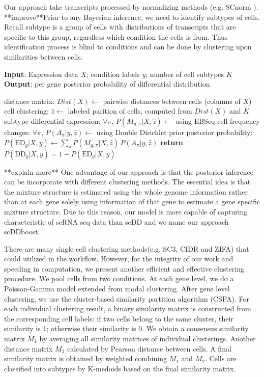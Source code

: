 \documentclass[11pt]{amsart}
\begin{document}
Our approach take transcripts processed by normalizing methods (e.g. SCnorm \cite{ref:Rhonda}). 
**improve**Prior to any Bayesian inference, we need to identify subtypes of cells. Recall subtype is a group of cells with distributions of transcripts that are specific to this group, regardless which condition the cells is from. Thus identification process is blind to conditions and can be done by clustering upon similarities between cells. 
\begin{algorithm}
\caption{}\label{alg:scDDboost}
\raggedright\hspace*{\algorithmicindent} \textbf{Input}: Expression data $X$; condition labels $y$; number of cell subtypes $K$ \\
\hspace*{\algorithmicindent} \textbf{Output}: per gene posterior probability of differential distribution
\begin{algorithmic}[1]
\State distance matrix: $Dist(X) \gets$ pairwise distances between cells (columns of $X$)
\State cell clustering: $\hat z \gets$ labeled parition of cells, computed from $Dist(X)$ and $K$
\State subtype differential expression: $\forall \pi$,  $P(M_{g,\pi} | X, \hat z)\gets$ using EBSeq\cite{ref:Leng}
\State cell frequency changes: $\forall \pi$, $P(A_\pi | y, \hat z)\gets$ using Double Dirichlet prior
\State posterior probability: $P(\text{ED}_g | X, y)\gets \underset{\pi}{\sum}P(M_{g,\pi} | X, \hat z) \,
 P(A_\pi | y, \hat z)$
\State \textbf{return} $P(\text{DD}_g |X, y)=1-P(\text{ED}_g| X,y)$
\EndProcedure
\end{algorithmic}
\end{algorithm}

**explain more**
One advantage of our approach is that the posterior inference can be incorporate with different clustering methods.
The essential idea is that the mixture structure is estimated using the whole genome information rather than at each gene solely using information of that gene  
to estimate a gene specific mixture structure. Due to this reason, our model is more capable of capturing characteristic of scRNA seq data than scDD and we name our approach scDDboost. 

There are many single cell clustering methods(e.g. SC3\cite{sc3}, CIDR\cite{CIDR} and ZIFA\cite{ZIFA}) that could utilized in the workflow. However, for the integrity of our work and speeding in computation, we present another efficient and effective clustering procedure.
We pool cells from two conditions. At each gene level, we do a Poisson-Gamma model extended from modal clustering\cite{ref:dahl}. After gene level clustering, we use the cluster-based similarity partition algorithm (CSPA\cite{ref:cspa}). For each individual clustering result, a binary similarity matrix is constructed from the corresponding cell labels: if two cells belong to the same cluster, their similarity is 1; otherwise their similarity is 0. We obtain a consensus similarity matrix $M_1$ by averaging all similarity matrices of individual clusterings. Another distance matrix $M_2$ calculated by Pearson distance between cells. A final similarity matrix is obtained by weighted combining $M_1$ and $M_2$. Cells are classified into subtypes by K-medoids based on the final similarity matrix. 
\end{document}
